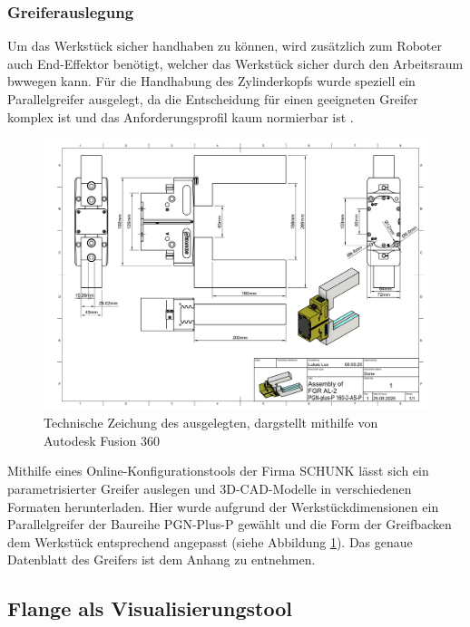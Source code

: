 \subsubsection{Greiferauslegung}

Um das Werkstück sicher handhaben zu können, wird zusätzlich zum Roboter auch
End-Effektor benötigt, welcher das Werkstück sicher durch den Arbeitsraum
bwwegen kann. Für die Handhabung des Zylinderkopfs wurde speziell ein Parallelgreifer
ausgelegt, da die Entscheidung für einen geeigneten Greifer komplex ist und das
Anforderungsprofil kaum normierbar ist .\\


\begin{figure}[H]
	\centering
	\includegraphics[width=\linewidth]{Figures/SchunkGreifer-1.png}
	\caption{Technische Zeichung des ausgelegten, dargstellt
		mithilfe von Autodesk Fusion 360}
	\label{figure:schunkGripper}
\end{figure}

\noindent Mithilfe eines Online-Konfigurationstools der Firma
SCHUNK lässt sich ein parametrisierter Greifer auslegen und
3D-CAD-Modelle in verschiedenen Formaten herunterladen. Hier wurde aufgrund der
Werkstückdimensionen ein Parallelgreifer der Baureihe PGN-Plus-P gewählt und die
Form der Greifbacken dem Werkstück entsprechend angepasst (siehe Abbildung
\ref{figure:schunkGripper}).
Das genaue Datenblatt des Greifers ist dem Anhang zu entnehmen.

\subsection{Flange als Visualisierungstool}

